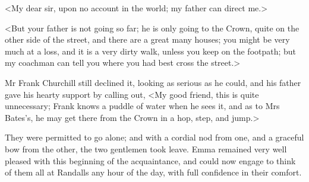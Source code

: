 <My dear sir, upon no account in the world; my father can direct me.>

<But your father is not going so far; he is only going to the Crown, quite on the other side of the street, and there are a great many houses; you might be very much at a loss, and it is a very dirty walk, unless you keep on the footpath; but my coachman can tell you where you had best cross the street.>

Mr Frank Churchill still declined it, looking as serious as he could, and his father gave his hearty support by calling out, <My good friend, this is quite unnecessary; Frank knows a puddle of water when he sees it, and as to Mrs Bates's, he may get there from the Crown in a hop, step, and jump.>

They were permitted to go alone; and with a cordial nod from one, and a graceful bow from the other, the two gentlemen took leave. Emma remained very well pleased with this beginning of the acquaintance, and could now engage to think of them all at Randalls any hour of the day, with full confidence in their comfort.